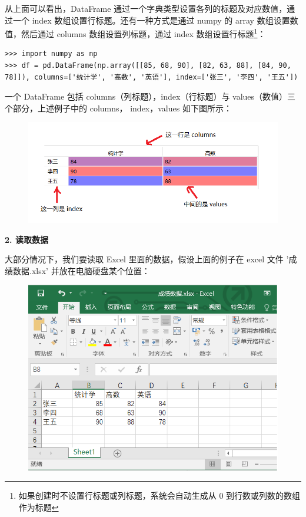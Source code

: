 从上面可以看出，DataFrame 通过一个字典类型设置各列的标题及对应数值，通过一个 index 数组设置行标题。还有一种方式是通过 numpy 的 array 数组设置数值，然后通过 columns 数组设置列标题，通过 index 数组设置行标题\footnote{如果创建时不设置行标题或列标题，系统会自动生成从 0 到行数或列数的数组作为标题}：

\begin{lstlisting}[Language=Python]
>>> import numpy as np
>>> df = pd.DataFrame(np.array([[85, 68, 90], [82, 63, 88], [84, 90, 78]]), columns=['统计学', '高数', '英语'], index=['张三', '李四', '王五'])
\end{lstlisting}

一个 DataFrame 包括 columns（列标题），index（行标题）与 values（数值）三个部分，上述例子中的 columns， index，values 如下图所示：

\begin{figure}[!ht]
\centering
  \includegraphics{figure/chapter2/pandas.png}
\end{figure}

\noindent\textbf{2. 读取数据}


大部分情况下，我们要读取 Excel 里面的数据，假设上面的例子在 excel 文件 '成绩数据.xlsx' 并放在电脑硬盘某个位置：

\begin{figure}[!ht]
\centering
  \includegraphics[scale=0.7]{figure/chapter2/pandas2.png}
\end{figure}

